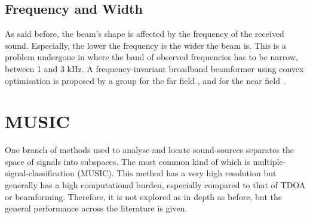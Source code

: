 \documentclass{report}
\begin{document}
\subsection{Frequency and Width}

As said before, the beam's shape is affected by the frequency of the received sound. Especially, the lower the frequency is the wider the beam is. This is a problem undergone in \cite{tamai_three_2005} where the band of observed frequencies has to be narrow, between 1 and 3 \si{kHz}. A frequency-invariant broadband beamformer using convex optimisation is proposed by a group for the far field \cite{argentieri_experimental_2005}, \cite{argentieri_prototyping_2005} and for the near field \cite{argentieri_modal_2006}.

\section{MUSIC}

One branch of methods used to analyse and locate sound-sources separates the space of signals into subspaces. The most common kind of which is multiple-signal-classification (MUSIC). This method has a very high resolution but generally has a high computational burden, especially compared to that of TDOA or beamforming. Therefore, it is not explored as in depth as before, but the general performance across the literature is given.
\end{document}
